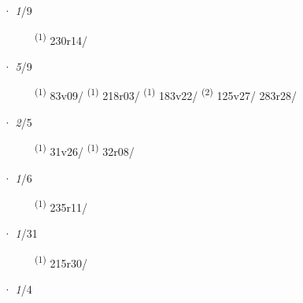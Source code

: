 \ENTRYEND
\noindent{} · \textit{1}/9 \LEMMALINE
\begin{description}
    \item[]  \textsuperscript{(1)} \mbox{230r14/}
\end{description}
\ENTRYEND
\noindent{} · \textit{5}/9 \LEMMALINE
\begin{description}
    \item[]  \textsuperscript{(1)} \mbox{83v09/} \textsuperscript{(1)} \mbox{218r03/} \CASEBREAK {} \textsuperscript{(1)} \mbox{183v22/} \CASEBREAK {} \textsuperscript{(2)} \mbox{125v27/} \mbox{283r28/}
\end{description}
\ENTRYEND
\noindent{} · \textit{2}/5 \LEMMALINE
\begin{description}
    \item[]  \textsuperscript{(1)} \mbox{31v26/} \textsuperscript{(1)} \mbox{32r08/}
\end{description}
\ENTRYEND
\noindent{} · \textit{1}/6 \LEMMALINE
\begin{description}
    \item[]  \textsuperscript{(1)} \mbox{235r11/}
\end{description}
\ENTRYEND
\noindent{} · \textit{1}/31 \LEMMALINE
\begin{description}
    \item[]  \textsuperscript{(1)} \mbox{215r30/}
\end{description}
\ENTRYEND
\noindent{} · \textit{1}/4 \LEMMALINE
